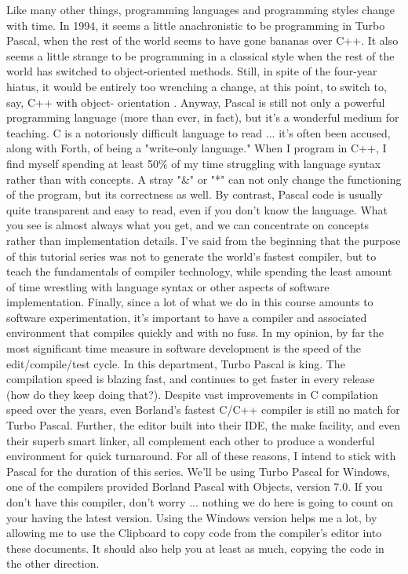 \documentclass[float=false, crop=false]{standalone}
\begin{document}
Like many other things, programming languages and programming styles change with
time. In 1994, it seems a little anachronistic to be programming in Turbo
Pascal, when the rest of the world seems to have gone bananas over C++. It also
seems a little strange to be programming in a classical style when the rest of
the world has switched to object-oriented methods. Still, in spite of the
four-year hiatus, it would be entirely too wrenching a change, at this point, to
switch to, say, C++ with object- orientation . Anyway, Pascal is still not only
a powerful programming language (more than ever, in fact), but it's a wonderful
medium for teaching. C is a notoriously difficult language to read ... it's
often been accused, along with Forth, of being a "write-only language." When I
program in C++, I find myself spending at least 50\% of my time struggling with
language syntax rather than with concepts. A stray "\&" or "*" can not only
change the functioning of the program, but its correctness as well. By contrast,
Pascal code is usually quite transparent and easy to read, even if you don't
know the language. What you see is almost always what you get, and we can
concentrate on concepts rather than implementation details. I've said from the
beginning that the purpose of this tutorial series was not to generate the
world's fastest compiler, but to teach the fundamentals of compiler technology,
while spending the least amount of time wrestling with language syntax or other
aspects of software implementation. Finally, since a lot of what we do in this
course amounts to software experimentation, it's important to have a compiler
and associated environment that compiles quickly and with no fuss. In my
opinion, by far the most significant time measure in software development is the
speed of the edit/compile/test cycle. In this department, Turbo Pascal is king.
The compilation speed is blazing fast, and continues to get faster in every
release (how do they keep doing that?). Despite vast improvements in C
compilation speed over the years, even Borland's fastest C/C++ compiler is still
no match for Turbo Pascal. Further, the editor built into their IDE, the make
facility, and even their superb smart linker, all complement each other to
produce a wonderful environment for quick turnaround. For all of these reasons,
I intend to stick with Pascal for the duration of this series. We'll be using
Turbo Pascal for Windows, one of the compilers provided Borland Pascal with
Objects, version 7.0. If you don't have this compiler, don't worry ... nothing
we do here is going to count on your having the latest version. Using the
Windows version helps me a lot, by allowing me to use the Clipboard to copy code
from the compiler's editor into these documents. It should also help you at
least as much, copying the code in the other direction.
\end{document}
